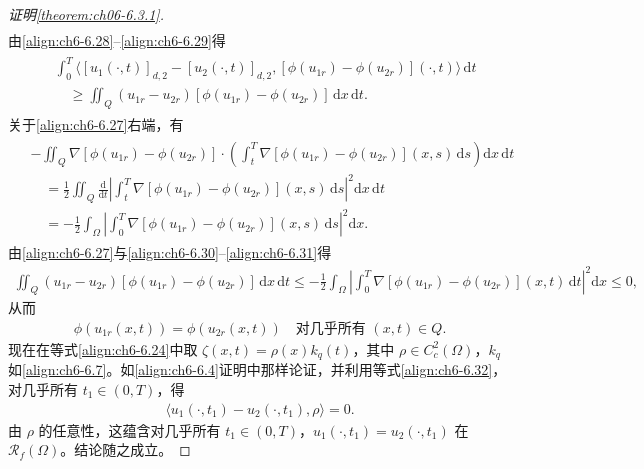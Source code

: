 \documentclass[../../main.tex]{subfiles}%
\begin{document}
\begin{proof}[证明\cref{theorem:ch06-6.3.1}]
\begin{align}
\end{align}
由\eqref{align:ch6-6.28}--\eqref{align:ch6-6.29}得
\begin{align}
\begin{aligned}
&\int_0^T\langle[u_1(\cdot,t)]_{d,2}-[u_2(\cdot,t)]_{d,2},
[\phi(u_{1r})-\phi(u_{2r})](\cdot,t)\rangle\,\mathrm{d}t\\
&\quad\geqslant\iint_Q(u_{1r}-u_{2r})[\phi(u_{1r})-\phi(u_{2r})]\,\mathrm{d}x\,\mathrm{d}t.
\end{aligned} \label{align:ch6-6.30}
\end{align}
关于\eqref{align:ch6-6.27}右端，有
\begin{align}
\begin{aligned}
&-\iint_Q\nabla[\phi(u_{1r})-\phi(u_{2r})]\cdot
\left(\int_t^T\nabla[\phi(u_{1r})-\phi(u_{2r})](x,s)\,\mathrm{d}s\right)\mathrm{d}x\,\mathrm{d}t\\
&\quad= \frac{1}{2}\iint_Q\frac{\mathrm{d}}{\mathrm{d}t}
\left|\int_t^T\nabla[\phi(u_{1r})-\phi(u_{2r})](x,s)\,\mathrm{d}s\right|^2\mathrm{d}x\,\mathrm{d}t\\
&\quad= -\frac{1}{2}\int_\Omega\left|\int_0^T\nabla[\phi(u_{1r})-\phi(u_{2r})](x,s)\,\mathrm{d}s\right|^2\mathrm{d}x.
\end{aligned} \label{align:ch6-6.31}
\end{align}
由\eqref{align:ch6-6.27}与\eqref{align:ch6-6.30}--\eqref{align:ch6-6.31}得
\begin{align*}
\iint_Q(u_{1r}-u_{2r})[\phi(u_{1r})-\phi(u_{2r})]\,\mathrm{d}x\,\mathrm{d}t
\leqslant-\frac{1}{2}\int_\Omega\left|\int_0^T\nabla[\phi(u_{1r})-\phi(u_{2r})](x,t)\,\mathrm{d}t\right|^2\mathrm{d}x\leqslant0,
\end{align*}
从而
\begin{align}
\phi(u_{1r}(x,t))=\phi(u_{2r}(x,t)) \quad\text{对几乎所有 }(x,t)\in Q. \label{align:ch6-6.32}
\end{align}
现在在等式\eqref{align:ch6-6.24}中取 $\zeta(x,t)=\rho(x)k_q(t)$，其中 $\rho\in C^2_c(\Omega)$，$k_q$ 如\eqref{align:ch6-6.7}。如\eqref{align:ch6-6.4}证明中那样论证，并利用等式\eqref{align:ch6-6.32}，对几乎所有 $t_1\in(0,T)$，得
\begin{align*}
\langle u_1(\cdot,t_1)-u_2(\cdot,t_1),\rho\rangle=0.
\end{align*}
由 $\rho$ 的任意性，这蕴含对几乎所有 $t_1\in(0,T)$，$u_1(\cdot,t_1)=u_2(\cdot,t_1)$ 在 $\mathscr{R}_f(\Omega)$。结论随之成立。
\end{proof}
\end{document}
